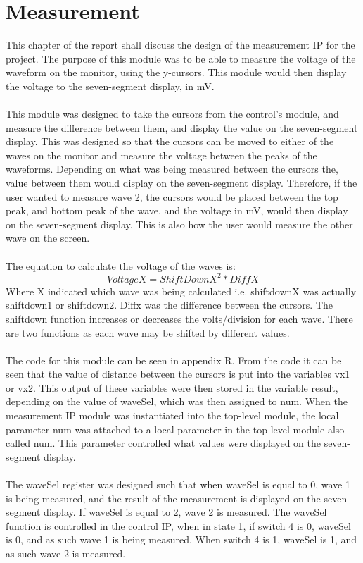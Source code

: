\documentclass[a4paper,12pt]{article}
\begin{document}
\section{Measurement}
\begin{flushleft}
This chapter of the report shall discuss the design of the measurement IP for the project. The purpose of this module was to be able to measure the voltage of the waveform on the monitor, using the y-cursors. This module would then display the voltage to the seven-segment display, in mV. \\ \- \\
This module was designed to take the cursors from the control’s module, and measure the difference between them, and display the value on the seven-segment display. This was designed so that the cursors can be moved to either of the waves on the monitor and measure the voltage between the peaks of the waveforms. Depending on what was being measured between the cursors the, value between them would display on the seven-segment display. Therefore, if the user wanted to measure wave 2, the cursors would be placed between the top peak, and bottom peak of the wave, and the voltage in mV, would then display on the seven-segment display. This is also how the user would measure the other wave on the screen. \\ \- \\
The equation to calculate the voltage of the waves is:
\begin{equation}
VoltageX = ShiftDownX^{2} * DiffX
\end{equation}
Where X indicated which wave was being calculated i.e. shiftdownX was actually shiftdown1 or shiftdown2. Diffx was the difference between the cursors. The shiftdown function increases or decreases the volts/division for each wave. There are two functions as each wave may be shifted by different values. \\ \- \\
The code for this module can be seen in appendix R. From the code it can be seen that the value of distance between the cursors is put into the variables vx1 or vx2. This output of these variables were then stored in the variable result, depending on the value of waveSel, which was then assigned to num. When the measurement IP module was instantiated into the top-level module, the local parameter num was attached to a local parameter in the top-level module also called num. This parameter controlled what values were displayed on the seven-segment display. \\ \- \\
The waveSel register was designed such that when waveSel is equal to 0, wave 1 is being measured, and the result of the measurement is displayed on the seven-segment display. If waveSel is equal to 2, wave 2 is measured. The waveSel function is controlled in the control IP, when in state 1, if switch 4 is 0, waveSel is 0, and as such wave 1 is being measured. When switch 4 is 1, waveSel is 1, and as such wave 2 is measured.  
\end{flushleft}
\newpage
\end{document}
